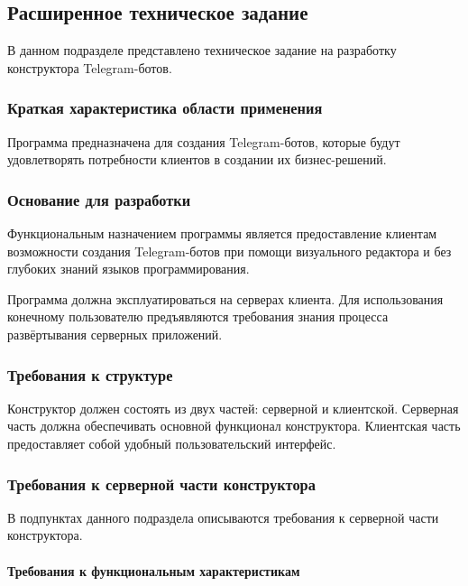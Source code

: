 

\subsection{Расширенное техническое задание}

В данном подразделе представлено техническое задание на разработку
конструктора Telegram-ботов.

\subsubsection{Краткая характеристика области применения}

Программа предназначена для создания
Telegram-ботов, которые будут удовлетворять
потребности клиентов в создании их бизнес-решений.


\subsubsection{Основание для разработки}

Функциональным назначением программы является предоставление
клиентам возможности создания Telegram-ботов при помощи визуального редактора и
без глубоких знаний языков программирования.

Программа должна эксплуатироваться на серверах клиента.
Для использования конечному пользователю предъявляются требования знания процесса
развёртывания серверных приложений.


\subsubsection{Требования к структуре}

Конструктор должен состоять из двух частей: серверной и клиентской.
Серверная часть должна обеспечивать основной функционал конструктора.
Клиентская часть предоставляет собой удобный пользовательский интерфейс.

\subsubsection{Требования к серверной части конструктора}

В подпунктах данного подраздела описываются требования к серверной части конструктора.

\paragraph{Требования к функциональным характеристикам}

